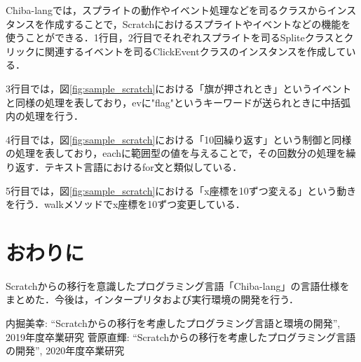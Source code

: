 \documentclass[twocolumn,10pt,a4j]{ltjsarticle}
\begin{document}
Chiba-langでは，スプライトの動作やイベント処理などを司るクラスからインスタンスを作成することで，Scratchにおけるスプライトやイベントなどの機能を使うことができる．1行目，2行目でそれぞれスプライトを司るSpliteクラスとクリックに関連するイベントを司るClickEventクラスのインスタンスを作成している．

3行目では，図\ref{fig:sample_scratch}における「旗が押されとき」というイベントと同様の処理を表しており，evに"flag"というキーワードが送られときに中括弧内の処理を行う．

4行目では，図\ref{fig:sample_scratch}における「10回繰り返す」という制御と同様の処理を表しており，eachに範囲型の値を与えることで，その回数分の処理を繰り返す．テキスト言語におけるfor文と類似している．

5行目では，図\ref{fig:sample_scratch}における「x座標を10ずつ変える」という動きを行う．walkメソッドでx座標を10ずつ変更している．


\section{おわりに}
Scratchからの移行を意識したプログラミング言語「Chiba-lang」の言語仕様をまとめた．今後は，インタープリタおよび実行環境の開発を行う．

\begin{thebibliography}{99}
 内掘美幸: ``Scratchからの移行を考慮したプログラミング言語と環境の開発'', 2019年度卒業研究
 菅原直輝: ``Scratchからの移行を考慮したプログラミング言語の開発'', 2020年度卒業研究
\end{thebibliography}
\end{document}
